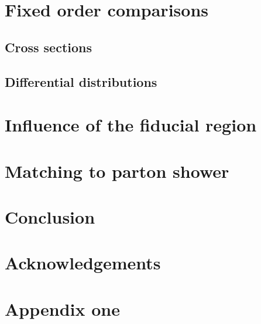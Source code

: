 \documentclass[11pt,epsf]{article}
\begin{document}
\section{Fixed order comparisons}

\subsection{Cross sections}



\subsection{Differential distributions}



\section{Influence of the fiducial region}

\section{Matching to parton shower}



\section{Conclusion}



\section*{Acknowledgements}



\appendix

\section{Appendix one}




\end{document}
